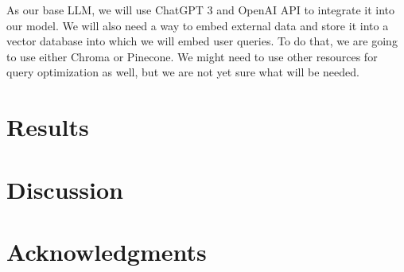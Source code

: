 \documentclass[fleqn,moreauthors,10pt]{ds_report}
\begin{document}
As our base LLM, we will use ChatGPT 3 and OpenAI API to integrate it into our model. We will also need a way to embed external data and store it into a vector database into which we will embed user queries.
To do that, we are going to use either Chroma or Pinecone. We might need to use other resources for query optimization as well, but we are not yet sure what will be needed.

\section*{Results}


\section*{Discussion}


\section*{Acknowledgments}



\end{document}
